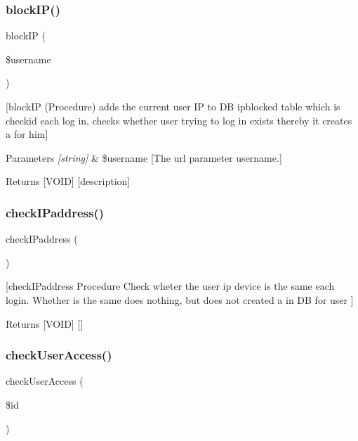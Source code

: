 \subsubsection{\texorpdfstring{block\+I\+P()}{blockIP()}}
{\footnotesize\ttfamily block\+IP (\begin{DoxyParamCaption}\item[{}]{\$username }\end{DoxyParamCaption})}

\mbox{[}block\+IP (Procedure) adds the current user IP to DB ipblocked table which is checkid each log in, checks whether user trying to log in exists thereby it creates a  for him\mbox{]} 
\begin{DoxyParams}{Parameters}
{\em \mbox{[}string\mbox{]}} & \$username \mbox{[}The url parameter username.\mbox{]} \\
\hline
\end{DoxyParams}
\begin{DoxyReturn}{Returns}
\mbox{[}V\+O\+ID\mbox{]} \mbox{[}description\mbox{]} 
\end{DoxyReturn}
\mbox{\label{security_8php_ae02fcab617b478cba90c4bcc17b81602}} 
\subsubsection{\texorpdfstring{check\+I\+Paddress()}{checkIPaddress()}}
{\footnotesize\ttfamily check\+I\+Paddress (\begin{DoxyParamCaption}{ }\end{DoxyParamCaption})}

\mbox{[}check\+I\+Paddress Procedure Check wheter the user ip device is the same each login. Whether is the same does nothing, but does not created a  in DB for user \mbox{]} \begin{DoxyReturn}{Returns}
\mbox{[}V\+O\+ID\mbox{]} \mbox{[}\mbox{]} 
\end{DoxyReturn}
\mbox{\label{security_8php_a4307f3ceb1b77b46b43f3f1b47351d58}} 
\subsubsection{\texorpdfstring{check\+User\+Access()}{checkUserAccess()}}
{\footnotesize\ttfamily check\+User\+Access (\begin{DoxyParamCaption}\item[{}]{\$id }\end{DoxyParamCaption})}

